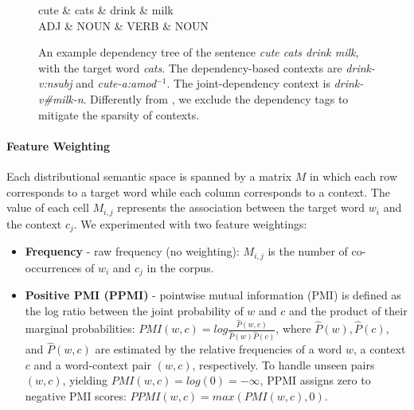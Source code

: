 \documentclass[11pt]{article}
\begin{document}
\begin{figure}[t] 
\centering
\small
\begin{dependency}
\begin{deptext}[column sep=3em]
		cute \& cats \& drink \& milk\\
		\tiny ADJ \& \tiny NOUN \& \tiny VERB \& \tiny NOUN \\
  \end{deptext}
\end{dependency}
\vspace*{-10pt}
\caption{An example dependency tree of the sentence \emph{cute cats drink milk}, with the target word \emph{cats}. 
The dependency-based contexts are \emph{drink-v:nsubj} and \emph{cute-a:amod$^{-1}$}. 
The joint-dependency context is \emph{drink-v\#milk-n}. Differently from , we exclude the dependency tags to mitigate the sparsity of contexts.}
\label{fig:dep}
\vspace*{-10pt}
\end{figure}

\paragraph{Feature Weighting} Each distributional semantic space is spanned by a matrix $M$ in which each row corresponds to a target word while each column corresponds to a context. The value of each cell $M_{i,j}$ represents the association between the target word $w_i$ and the context $c_j$. We experimented with two feature weightings:

\begin{itemize}[leftmargin=*]
\vspace*{-2pt}
\item \textbf{Frequency} - raw frequency (no weighting): $M_{i,j}$ is the number of co-occurrences of $w_i$ and $c_j$ in the corpus.

\vspace*{-2pt}
\item \textbf{Positive PMI (PPMI)} - pointwise mutual information (PMI) \cite{church1990word} is defined as the log ratio between the joint probability of $w$ and $c$ and the product of their marginal probabilities: $PMI(w, c) = log\frac{\hat{P}(w,c)}{\hat{P}(w)\hat{P}(c)}$, where $\hat{P}(w), \hat{P}(c)$, and $\hat{P}(w,c)$ are estimated by the relative frequencies of a word $w$, a context $c$ and a word-context pair $(w,c)$, respectively. To handle unseen pairs $(w,c)$, yielding $PMI(w,c) = log(0) = -\infty$, PPMI \cite{bullinaria2007extracting} assigns zero to negative PMI scores: $PPMI(w,c) = max(PMI(w,c), 0)$.

\end{itemize}
\end{document}

